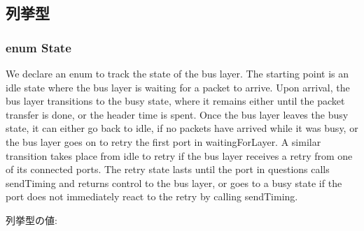 \subsection{列挙型}
\hypertarget{classBaseBus_1_1Layer_a5d74787dedbc4e11c1ab15bf487e61f8}{
\subsubsection[{State}]{\setlength{\rightskip}{0pt plus 5cm}enum {\bf State}}}
\label{classBaseBus_1_1Layer_a5d74787dedbc4e11c1ab15bf487e61f8}
We declare an enum to track the state of the bus layer. The starting point is an idle state where the bus layer is waiting for a packet to arrive. Upon arrival, the bus layer transitions to the busy state, where it remains either until the packet transfer is done, or the header time is spent. Once the bus layer leaves the busy state, it can either go back to idle, if no packets have arrived while it was busy, or the bus layer goes on to retry the first port in waitingForLayer. A similar transition takes place from idle to retry if the bus layer receives a retry from one of its connected ports. The retry state lasts until the port in questions calls sendTiming and returns control to the bus layer, or goes to a busy state if the port does not immediately react to the retry by calling sendTiming. \begin{Desc}
\item[列挙型の値: ]\par
\begin{description}
\item[{\em 
\hypertarget{classBaseBus_1_1Layer_a5d74787dedbc4e11c1ab15bf487e61f8afd6a0e4343048b10646dd2976cc5ad18}{
IDLE}
\label{classBaseBus_1_1Layer_a5d74787dedbc4e11c1ab15bf487e61f8afd6a0e4343048b10646dd2976cc5ad18}
}]\item[{\em 
\hypertarget{classBaseBus_1_1Layer_a5d74787dedbc4e11c1ab15bf487e61f8aa6e504d57ec9777faa0185fbd3b93b97}{
BUSY}
\label{classBaseBus_1_1Layer_a5d74787dedbc4e11c1ab15bf487e61f8aa6e504d57ec9777faa0185fbd3b93b97}
}]\item[{\em 
\hypertarget{classBaseBus_1_1Layer_a5d74787dedbc4e11c1ab15bf487e61f8a76d44342c42b85edbde0cae33f14c5de}{
RETRY}
\label{classBaseBus_1_1Layer_a5d74787dedbc4e11c1ab15bf487e61f8a76d44342c42b85edbde0cae33f14c5de}
}]\end{description}
\end{Desc}



